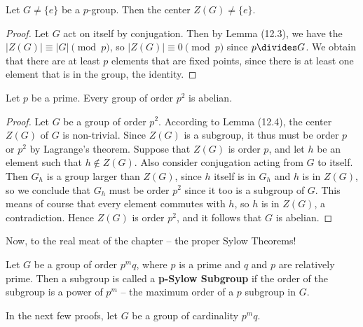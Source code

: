 \begin{lemma}
    Let $G \neq \{e\}$ be a $p$-group. Then the center $Z(G) \neq \{e\}$.
\end{lemma}
\begin{proof}
    Let $G$ act on itself by conjugation. Then by Lemma (12.3), we have the $|Z(G)| \equiv |G| \pmod{p}$, so $|Z(G)| \equiv 0 \pmod{p}$ since $p \divides G$. We obtain that there are at least $p$ elements that are fixed points, since there is at least one element that is in the group, the identity.
\end{proof}

\begin{corollary}
    Let $p$ be a prime. Every group of order $p^2$ is abelian.
\end{corollary}
\begin{proof}
    Let $G$ be a group of order $p^2$. According to Lemma (12.4), the center $Z(G)$ of $G$ is non-trivial. Since $Z(G)$ is a subgroup, it thus must be order $p$ or $p^2$ by Lagrange's theorem. Suppose that $Z(G)$ is order $p$, and let $h$ be an element such that $h \notin Z(G)$. Also consider conjugation acting from $G$ to itself. Then $G_h$ is a group larger than $Z(G)$, since $h$ itself is in $G_h$ and $h$ is in $Z(G)$, so we conclude that $G_h$ must be order $p^2$ since it too is a subgroup of $G$. This means of course that every element commutes with $h$, so $h$ is in $Z(G)$, a contradiction. Hence $Z(G)$ is order $p^2$, and it follows that $G$ is abelian.
\end{proof}

Now, to the real meat of the chapter -- the proper Sylow Theorems!

Let $G$ be a group of order $p^mq$, where $p$ is a prime and $q$ and $p$ are relatively prime. Then a subgroup is called a {\bf p-Sylow Subgroup}  if the order of the subgroup is a power of $p^m$ -- the maximum order of a $p$ subgroup in $G$.

In the next few proofs, let $G$ be a group of cardinality $p^mq$.

